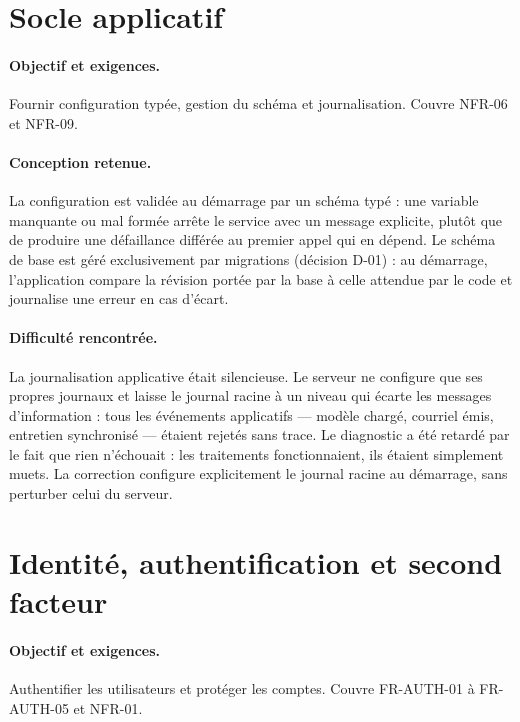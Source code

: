 \section{Socle applicatif}
\label{sec:impl_foundation}

\paragraph{Objectif et exigences.} Fournir configuration typée, gestion du
schéma et journalisation. Couvre NFR-06 et NFR-09.

\paragraph{Conception retenue.} La configuration est validée au démarrage par
un schéma typé : une variable manquante ou mal formée arrête le service avec
un message explicite, plutôt que de produire une défaillance différée au
premier appel qui en dépend. Le schéma de base est géré exclusivement par
migrations (décision D-01) : au démarrage, l'application compare la révision
portée par la base à celle attendue par le code et journalise une erreur en
cas d'écart.

\paragraph{Difficulté rencontrée.} La journalisation applicative était
silencieuse. Le serveur ne configure que ses propres journaux et laisse le
journal racine à un niveau qui écarte les messages d'information : tous les
événements applicatifs — modèle chargé, courriel émis, entretien synchronisé —
étaient rejetés sans trace. Le diagnostic a été retardé par le fait que rien
n'échouait : les traitements fonctionnaient, ils étaient simplement muets. La
correction configure explicitement le journal racine au démarrage, sans
perturber celui du serveur.

\section{Identité, authentification et second facteur}
\label{sec:impl_authentication}

\paragraph{Objectif et exigences.} Authentifier les utilisateurs et protéger
les comptes. Couvre FR-AUTH-01 à FR-AUTH-05 et NFR-01.

